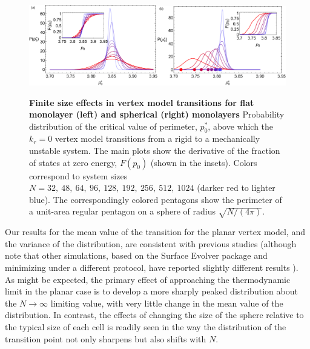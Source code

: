 \documentclass[aps,pre,reprint,superscriptaddress,nofootinbib]{revtex4-2}
\begin{document}
\begin{figure}[bht!]
\centerline{
\includegraphics[width=0.5\textwidth]{flatTransitionKA0.pdf}\includegraphics[width=0.5\textwidth]{transitionKA0.pdf}
}
\caption{\label{fig:transitionDistribution}
{\bf{Finite size effects in vertex model transitions for flat monolayer (left) and spherical (right) monolayers}} 
Probability distribution of the critical value of perimeter, $p_0^*$, above which the $k_r=0$ vertex model transitions from a rigid to a mechanically unstable system. The main plots show the derivative of the fraction of states at zero energy, $F(p_0)$ (shown in the insets). Colors correspond to system sizes $N=32,\ 48,\ 64,\ 96,\ 128,\ 192,\ 256,\ 512,\ 1024$ (darker red to lighter blue). The correspondingly colored pentagons show the perimeter of a unit-area regular pentagon on a sphere of radius  $\sqrt{N/(4\pi)}$.}
\end{figure}


Our results for the mean value of the transition for the planar vertex model, and the variance of the distribution, are consistent with previous studies \cite{merkel2019minimal} (although note that other simulations, based on the Surface Evolver package \cite{brakke1992surface} and minimizing under a different protocol, have reported slightly different results \cite{Bi2015}). As might be expected, the primary effect of approaching the thermodynamic limit in the planar case is to develop a more sharply peaked distribution about the $N\rightarrow\infty$ limiting value, with very little change in the mean value of the distribution. In contrast, the effects of changing the size of the sphere relative to the typical size of each cell is readily seen in the way the distribution of the transition point not only sharpens but also shifts with $N$.
\end{document}
